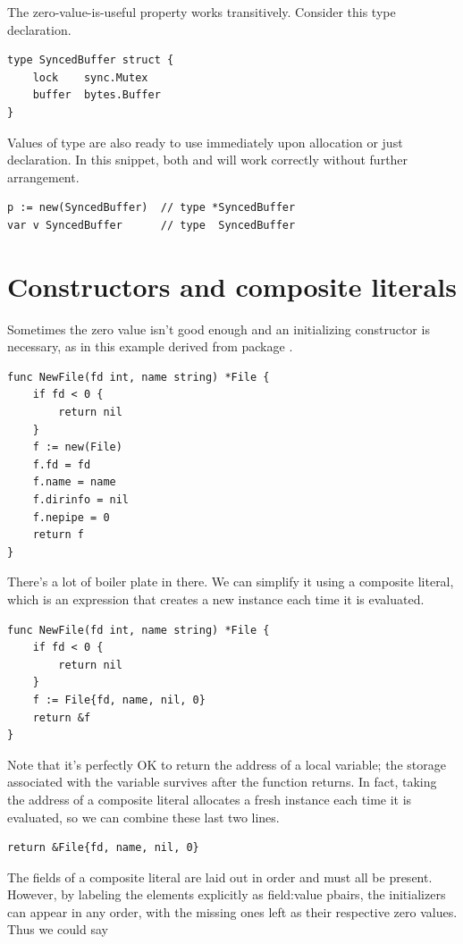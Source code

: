 The zero-value-is-useful property works transitively. Consider this type
declaration.

\begin{lstlisting}
type SyncedBuffer struct {
    lock    sync.Mutex
    buffer  bytes.Buffer
}
\end{lstlisting}
Values of type  are also ready to use immediately upon
allocation or just declaration. In this snippet, both  and
 will work
correctly without further arrangement.
\begin{lstlisting}
p := new(SyncedBuffer)  // type *SyncedBuffer
var v SyncedBuffer      // type  SyncedBuffer
\end{lstlisting}

\section{Constructors and composite literals}
Sometimes the zero value isn't good enough and an initializing
constructor is necessary, as in this example derived from package
.
\begin{lstlisting}
func NewFile(fd int, name string) *File {
    if fd < 0 {
        return nil
    }
    f := new(File)
    f.fd = fd
    f.name = name
    f.dirinfo = nil
    f.nepipe = 0
    return f
}
\end{lstlisting}
There's a lot of boiler plate in there. We can simplify it using a
composite literal, which is an expression that creates a new instance
each time it is evaluated.

\begin{lstlisting}
func NewFile(fd int, name string) *File {
    if fd < 0 {
        return nil
    }
    f := File{fd, name, nil, 0}
    return &f
}
\end{lstlisting}
Note that it's perfectly OK to return the address of a local variable;
the storage associated with the variable survives after the function
returns. In fact, taking the address of a composite literal allocates a
fresh instance each time it is evaluated, so we can combine these last
two lines.

\begin{lstlisting}
return &File{fd, name, nil, 0}
\end{lstlisting}
The fields of a composite literal are laid out in order and must all be
present. However, by labeling the elements explicitly as field:value
pbairs, the initializers can appear in any order, with the missing ones
left as their respective zero values. Thus we could say

